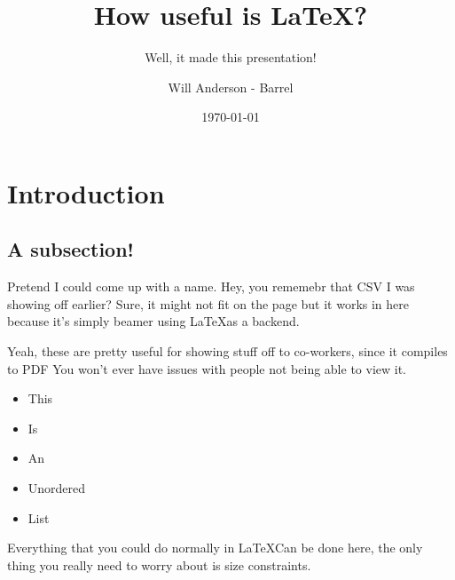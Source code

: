 \documentclass{beamer}
\begin{document}
\title{How useful is \LaTeX?}
\subtitle{Well, it made this presentation!}
\author{Will Anderson - Barrel}
\date{\today}
\frame{\titlepage}

\section{Introduction}
\subsection{A subsection!}
\begin{frame}{Pretend I could come up with a name.}
	Hey, you rememebr that CSV I was showing off earlier? Sure, it might not fit on the page but it works in here because it's simply beamer using \LaTeX as a backend.
\end{frame}

\begin{frame}
	Yeah, these are pretty useful for showing stuff off to co-workers, since it compiles to PDF You won't ever have issues with people not being able to view it.
	\begin{itemize}
		\item This
		\item Is
		\item An 
		\item Unordered
		\item List
	\end{itemize}

	Everything that you could do normally in \LaTeX Can be done here, the only thing you really need to worry about is size constraints.

\end{frame}
\end{document}
